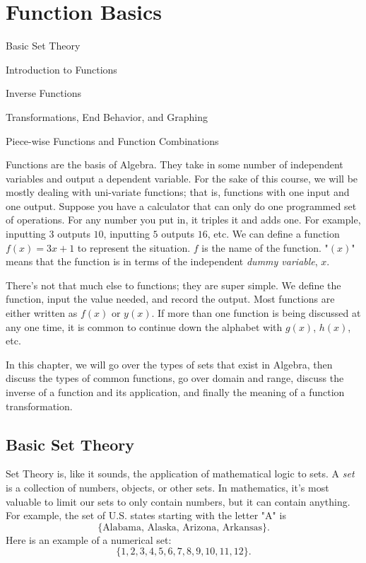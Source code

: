\documentclass[../book.tex]{subfiles}
\begin{document}
\chapter{Function Basics}
\begin{introduction}[Contents]
\item Basic Set Theory
\item Introduction to Functions
\item Inverse Functions
\item Transformations, End Behavior, and Graphing
\item Piece-wise Functions and Function Combinations
\end{introduction}
Functions are the basis of Algebra.  They take in some number of independent variables and output a dependent variable.  For the sake of this course, we will be mostly dealing with uni-variate functions; that is, functions with one input and one output.  Suppose you have a calculator that can only do one programmed set of operations.  For any number you put in, it triples it and adds one.  For example, inputting $3$ outputs $10$, inputting $5$ outputs $16$, etc.  We can define a function $f(x)=3x+1$ to represent the situation.  $f$ is the name of the function.  "$(x)$" means that the function is in terms of the independent \textit{dummy variable}, $x$.

There's not that much else to functions; they are super simple.  We define the function, input the value needed, and record the output.  Most functions are either written as $f(x)$ or $y(x)$.  If more than one function is being discussed at any one time, it is common to continue down the alphabet with $g(x)$, $h(x)$, etc.

In this chapter, we will go over the types of sets that exist in Algebra, then discuss the types of common functions, go over domain and range, discuss the inverse of a function and its application, and finally the meaning of a function transformation.
\section{Basic Set Theory}
\noindent Set Theory is, like it sounds, the application of mathematical logic to sets.  A \textit{set} is a collection of numbers, objects, or other sets.  In mathematics, it's most valuable to limit our sets to only contain numbers, but it can contain anything.  For example, the set of U.S.  states starting with the letter "A" is $$\{\text{Alabama, Alaska, Arizona, Arkansas}\}.$$
Here is an example of a numerical set: $$\{1,2,3,4,5,6,7,8,9,10,11,12\}.$$
\end{document}
